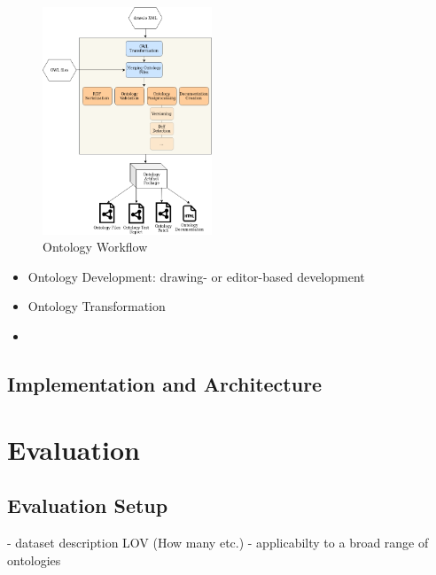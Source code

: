 \documentclass[sigconf]{acmart}
\begin{document}
\begin{figure}[ht]
  \centering
  \includegraphics[width=0.45\textwidth]{Workflow.png}
  \caption{Ontology Workflow}
  \label{fig2}
\end{figure}
\begin{itemize}
  \item Ontology Development: drawing- or editor-based development 
  \item Ontology Transformation
  \item 
\end{itemize}

\subsection{Implementation and Architecture}

\section{Evaluation}

\subsection{Evaluation Setup}
- dataset description LOV (How many etc.)
- applicabilty to a broad range of ontologies 
\end{document}
